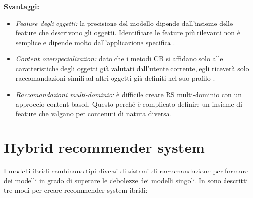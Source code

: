 \documentclass[12pt,italian]{report}
\begin{document}
\noindent \textbf{Svantaggi:}
\begin{itemize}
 \item \textit{Feature degli oggetti:} la precisione del modello dipende dall'insieme delle feature che descrivono gli oggetti. Identificare le feature più rilevanti non è semplice e dipende molto dall'applicazione specifica \cite{survey-mattia}.
 
 \item \textit{Content overspecialization:} dato che i metodi CB si affidano solo alle caratteristiche degli oggetti già valutati dall'utente corrente, egli riceverà solo raccomandazioni simili ad altri oggetti già definiti nel suo profilo \cite{recsys-principle-methods-evaluation}.
 
 \item \textit{Raccomandazioni multi-dominio:} è difficile creare RS multi-dominio con un approccio content-based. Questo perché è complicato definire un insieme di feature che valgano per contenuti di natura diversa.
\end{itemize}

\section{Hybrid recommender system}
I modelli ibridi combinano tipi diversi di sistemi di raccomandazione per formare dei modelli in grado di superare le debolezze dei modelli singoli. In \cite{recsys-book} sono descritti tre modi per creare recommender system ibridi:
\end{document}
